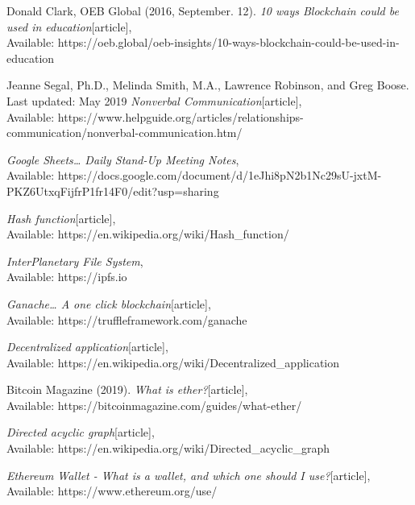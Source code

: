 \begin{thebibliography}{20}
Donald Clark, OEB Global (2016, September. 12).
\emph{10 ways Blockchain could be used in education}[article],\\
Available: {https://oeb.global/oeb-insights/10-ways-blockchain-could-be-used-in-education}

  Jeanne Segal, Ph.D., Melinda Smith, M.A., Lawrence Robinson, and Greg Boose. Last updated: May 2019
\emph{Nonverbal Communication}[article],\\
Available: {https://www.helpguide.org/articles/relationships-communication/nonverbal-communication.htm/}

\emph{Google Sheets… Daily Stand-Up Meeting Notes},\\
Available: {https://docs.google.com/document/d/1eJhi8pN2b1Nc29sU-jxtM-PKZ6UtxqFijfrP1fr14F0/edit?usp=sharing}

\emph{Hash function}[article],\\
Available: {https://en.wikipedia.org/wiki/Hash\_function/}

\emph{InterPlanetary File System},\\
Available: {https://ipfs.io}

\emph{Ganache… A one click blockchain}[article],\\
Available: {https://truffleframework.com/ganache}

\emph{Decentralized application}[article],\\
Available: {https://en.wikipedia.org/wiki/Decentralized\_application}

 Bitcoin Magazine (2019).
\emph{What is ether?}[article],\\
Available: {https://bitcoinmagazine.com/guides/what-ether/}

\emph{Directed acyclic graph}[article],\\
Available: {https://en.wikipedia.org/wiki/Directed\_acyclic\_graph}

\emph{Ethereum Wallet - What is a wallet, and which one should I use?}[article],\\
Available: {https://www.ethereum.org/use/}

\end{thebibliography}

